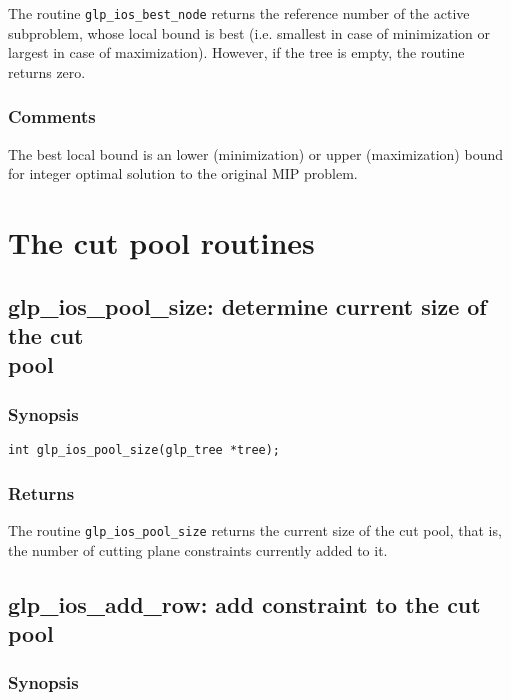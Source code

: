 The routine \verb|glp_ios_best_node| returns the reference number of
the active subproblem, whose local bound is best (i.e. smallest in case
of minimization or largest in case of maximization). However, if the
tree is empty, the routine returns zero.

\subsubsection*{Comments}

The best local bound is an lower (minimization) or upper (maximization)
bound for integer optimal solution to the original MIP problem.


\newpage

\section{The cut pool routines}

\subsection{glp\_ios\_pool\_size: determine current size of the cut\\
pool}

\subsubsection*{Synopsis}

\begin{verbatim}
int glp_ios_pool_size(glp_tree *tree);
\end{verbatim}

\subsubsection*{Returns}

The routine \verb|glp_ios_pool_size| returns the current size of the
cut pool, that is, the number of cutting plane constraints currently
added to it.

\subsection{glp\_ios\_add\_row: add constraint to the cut pool}

\subsubsection*{Synopsis}

